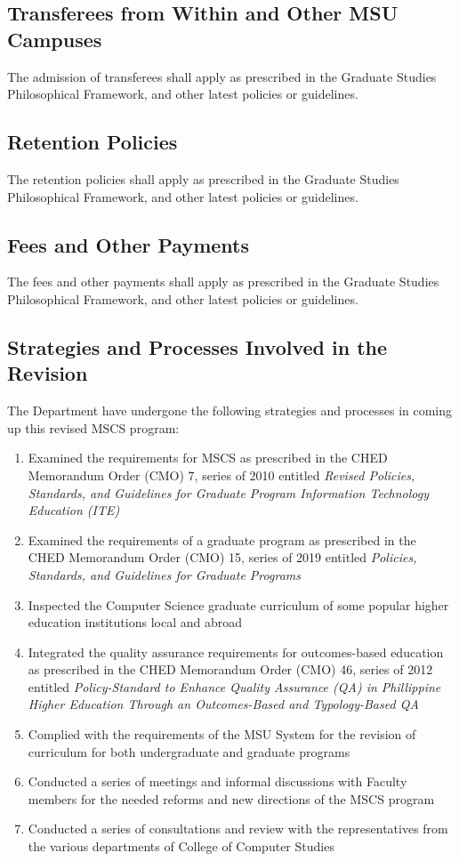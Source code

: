 \documentclass[11pt,a4paper]{article}
\begin{document}
\subsection{Transferees from Within and Other MSU Campuses}

The admission of transferees shall apply as prescribed in the Graduate Studies Philosophical Framework, and other latest policies or guidelines.

\subsection{Retention Policies}

The retention policies shall apply as prescribed in the Graduate Studies Philosophical Framework, and other latest policies or guidelines.

\subsection{Fees and Other Payments}

The fees and other payments shall apply as prescribed in the Graduate Studies Philosophical Framework, and other latest policies or guidelines.

\subsection{Strategies and Processes Involved in the Revision}

The Department have undergone the following strategies and processes in coming up this revised MSCS program:
\begin{enumerate}
\item Examined the requirements for MSCS as prescribed in the CHED Memorandum Order (CMO) 7, series of 2010 entitled \textit{Revised Policies, Standards, and Guidelines for Graduate Program Information Technology Education (ITE)}
\item Examined the requirements of a graduate program as prescribed in the CHED Memorandum Order (CMO) 15, series of 2019 entitled  \textit{Policies, Standards, and Guidelines for Graduate Programs}
\item Inspected the Computer Science graduate curriculum of some popular higher education institutions local and abroad
\item Integrated the quality assurance requirements for outcomes-based education as prescribed in the CHED Memorandum Order (CMO) 46, series of 2012 entitled \textit{Policy-Standard to Enhance Quality Assurance (QA) in Phillippine Higher Education Through an Outcomes-Based and Typology-Based QA} 
\item Complied with the requirements of the MSU System for the revision of curriculum for both undergraduate and graduate programs
\item Conducted a series of meetings and informal discussions with Faculty members for the needed reforms and new directions of the MSCS program
\item Conducted a series of consultations and review with the representatives from the various departments of College of Computer Studies
\end{enumerate}
\end{document}
